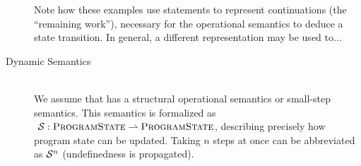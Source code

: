 \begin{description}
    Note how these examples use statements to represent continuations (the “remaining work”), necessary for the operational semantics to deduce a state transition.
    In general, a different representation may be used to...
    
    \begin{comment}
    In order to determine the next program state (or detect termination), a state must have a notion of “upcoming work”, usually represented by a statement internally.
    TODO: reasonable to call that “continuation”?
    
    Let $\setProgramState_s$ (with $s \in \setStmt$) be the set of program states having $s$ as upcoming work.
    This notion will be necessary to define soundness of \svl's static semantics.
    
    Examples:
    \begin{description}
        \item[Primitive]
        \begin{flalign*}
        	 & \setProgramState ~=~ \underbrace{(\setVar \rightharpoonup \mathbb{Z})}_{\textit{variable memory}} ~\times~ \setStmt & ~ \\
        	 & \setProgramState_s ~=~ (\setVar \rightharpoonup \mathbb{Z}) ~\times~ \setStmt_s                                     &
        \end{flalign*}
        
        \item[Stack]
        \begin{flalign*}
        	 & \setProgramState ~=~ \bigcup_{i \in \mathbb{N}_+}{\underbrace{\Big((\setVar \rightharpoonup \mathbb{Z}) ~\times~ \setStmt \Big)}_{\textit{stack frame}}}^i                                                                                \\
        	 & \setProgramState_s ~=~ \Big((\setVar \rightharpoonup \mathbb{Z}) ~\times~ \setStmt_s\Big) ~\times~ \underbrace{\bigcup_{i \in \mathbb{N}_0}{\Big((\setVar \rightharpoonup \mathbb{Z}) ~\times~ \setStmt \Big)^i}}_{\textit{lower frames}}
        \end{flalign*}
    \end{description}
     
    TODO: notion of initial state?
    \end{comment}
    
    
\item[Dynamic Semantics]~\\
    We assume that \svl has a structural operational semantics or small-step semantics.
    This semantics is formalized as $~\mathcal{S} : \textup{\textsc{ProgramState}} \rightharpoonup \textup{\textsc{ProgramState}}$, describing precisely how program state can be updated. %
    Taking $n$ steps at once can be abbreviated as $\mathcal{S}^n$ (undefinedness is propagated).
    

\end{description}

